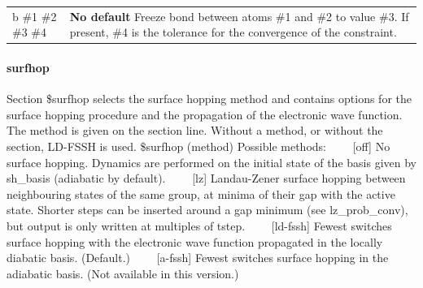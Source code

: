 \documentclass{report}
\newcommand{\tabitem}{~~\llap{--}~~}
\begin{document}
\begin{tabularx}{\textwidth}{ m{2.5cm} X }
b \#1 \#2 \#3 \#4		&
	\textbf{No default} \newline
	Freeze bond between atoms \#1 and \#2 to value \#3. If present, \#4 is the tolerance for the convergence of the constraint.  \\

\end{tabularx}


\paragraph{surfhop}
Section \$surfhop selects the surface hopping method and contains options for the surface hopping procedure and the propagation of the electronic wave function. The method is given on the section line. Without a method, or without the section, LD-FSSH is used. \newline
\$surfhop (method) \newline
Possible methods: \newline
	\tabitem [off] No surface hopping. Dynamics are performed on the initial state of the basis given by sh\_basis (adiabatic by default). \newline
	\tabitem [lz] Landau-Zener surface hopping between neighbouring states of the same group, at minima of their gap with the active state. Shorter steps can be inserted around a gap minimum (see lz\_prob\_conv), but output is only written at multiples of tstep. \newline
	\tabitem [ld-fssh] Fewest switches surface hopping with the electronic wave function propagated in the locally diabatic basis. (Default.) \newline
	\tabitem [a-fssh] Fewest switches surface hopping in the adiabatic basis. (Not available in this version.)
\end{document}
